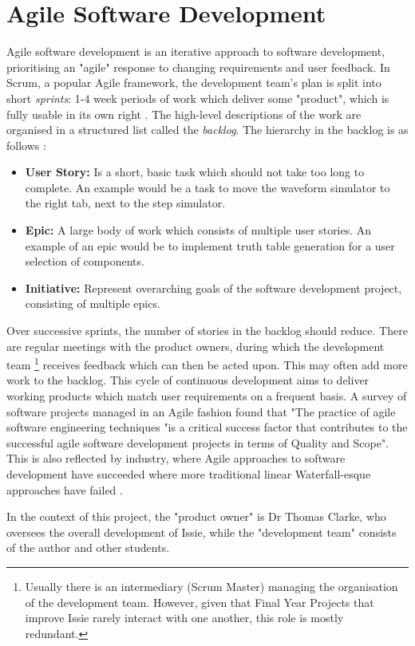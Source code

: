 \section{Agile Software Development}
Agile software development \cite{alma9955899676101591} is an iterative approach to software development, prioritising an "agile" response to changing requirements and user feedback. In Scrum, a popular Agile framework, the development team's plan is split into short \textit{sprints}: 1-4 week periods of work which deliver some "product", which is fully usable in its own right \cite{mepCW}. The high-level descriptions of the work are organised in a structured list called the \textit{backlog}. The hierarchy in the backlog is as follows \cite{backlog}:
\begin{itemize}
    \item \textbf{User Story:} Is a short, basic task which should not take too long to complete. An example would be a task to move the waveform simulator to the right tab, next to the step simulator.
    \item \textbf{Epic:} A large body of work which consists of multiple user stories. An example of an epic would be to implement truth table generation for a user selection of components.
    \item \textbf{Initiative:} Represent overarching goals of the software development project, consisting of multiple epics.
\end{itemize}

Over successive sprints, the number of stories in the backlog should reduce. There are regular meetings with the product owners, during which the development team \footnote{Usually there is an intermediary (Scrum Master) managing the organisation of the development team. However, given that Final Year Projects that improve Issie rarely interact with one another, this role is mostly redundant.} receives feedback which can then be acted upon. This may often add more work to the backlog. This cycle of continuous development aims to deliver working products which match user requirements on a frequent basis.
A survey \cite{CHOW2008961} of software projects managed in an Agile fashion found that "The practice of agile software engineering techniques "is a critical success factor that contributes to the successful agile software development projects in terms of Quality and Scope". This is also reflected by industry, where Agile approaches to software development have succeeded where more traditional linear Waterfall-esque approaches have failed \cite{mepCW}.

In the context of this project, the "product owner" is Dr Thomas Clarke, who oversees the overall development of Issie, while the "development team" consists of the author and other students.